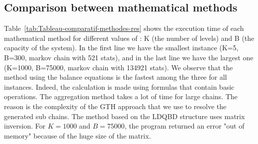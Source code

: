 \documentclass[conference]{IEEEtran}
\begin{document}
\subsection{Comparison between mathematical methods}
Table~\ref{tab:Tableau-comparatif-methodes-res} shows the execution time of each mathematical method for different values of : K (the number of levels) and B (the capacity of the system). In the first line we have the smallest instance (K=5, B=300, markov chain with 521 stats), and in the last line we have the largest one (K=1000, B=75000, markov chain with 134921 stats). We observe that the method using the balance equations is the fastest among the three for all instances. Indeed, the calculation is made using formulas that contain basic operations. The aggregation method takes a lot of time for large chains. The reason is the complexity of the GTH approach that we use to resolve the generated sub chains. The method based on the LDQBD structure uses matrix inversion. For $K = 1000$ and $B = 75000$, the program returned an error "out of memory" because of the huge size of the matrix.
\end{document}

